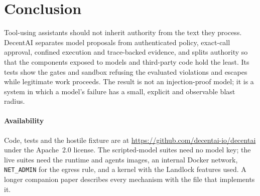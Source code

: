 \documentclass[10pt,twocolumn,a4paper]{article}
\newcommand{\sys}{DecentAI}
\newcommand{\code}[1]{\texttt{\small #1}}
\begin{document}
\section{Conclusion}

Tool-using assistants should not inherit authority from the text they
process. \sys{} separates model proposals from authenticated policy,
exact-call approval, confined execution and trace-backed evidence, and
splits authority so that the components exposed to models and
third-party code hold the least. Its tests show the gates and sandbox
refusing the evaluated violations and escapes while legitimate work
proceeds. The result is not an injection-proof model; it is a system in
which a model's failure has a small, explicit and observable blast
radius.

\paragraph{Availability}
Code, tests and the hostile fixture are at
\url{https://github.com/decentai-io/decentai} under the Apache~2.0
license. The scripted-model suites need no model key; the live suites
need the runtime and agents images, an internal Docker network,
\code{NET\_ADMIN} for the egress rule, and a kernel with the Landlock
features used. A longer companion paper describes every mechanism with
the file that implements it.

\small


\end{document}

